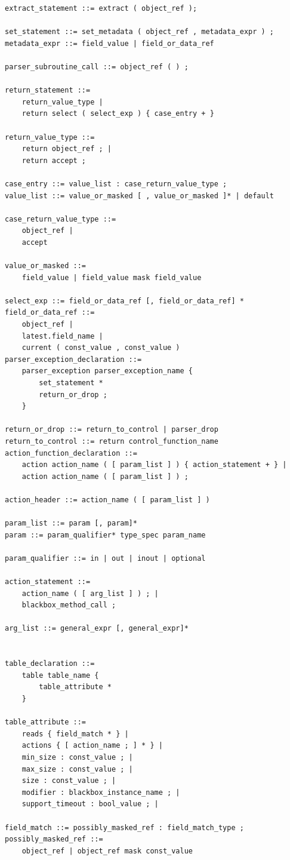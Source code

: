 \documentclass[12pt]{article}
\begin{document}
\begin{lstlisting}[style=BNFstyle]
extract_statement ::= extract ( object_ref ); 

set_statement ::= set_metadata ( object_ref , metadata_expr ) ;
metadata_expr ::= field_value | field_or_data_ref

parser_subroutine_call ::= object_ref ( ) ; 

return_statement ::=
    return_value_type |
    return select ( select_exp ) { case_entry + }

return_value_type ::= 
    return object_ref ; | 
    return accept ;

case_entry ::= value_list : case_return_value_type ;
value_list ::= value_or_masked [ , value_or_masked ]* | default

case_return_value_type ::= 
    object_ref | 
    accept

value_or_masked ::=
    field_value | field_value mask field_value

select_exp ::= field_or_data_ref [, field_or_data_ref] * 
field_or_data_ref ::=
    object_ref |
    latest.field_name |
    current ( const_value , const_value )
parser_exception_declaration ::=
    parser_exception parser_exception_name {
        set_statement *
        return_or_drop ;
    }

return_or_drop ::= return_to_control | parser_drop
return_to_control ::= return control_function_name
action_function_declaration ::=
    action action_name ( [ param_list ] ) { action_statement + } |
    action action_name ( [ param_list ] ) ;

action_header ::= action_name ( [ param_list ] )

param_list ::= param [, param]*
param ::= param_qualifier* type_spec param_name

param_qualifier ::= in | out | inout | optional

action_statement ::= 
    action_name ( [ arg_list ] ) ; |
    blackbox_method_call ;

arg_list ::= general_expr [, general_expr]*


table_declaration ::=
    table table_name {
        table_attribute *
    }

table_attribute ::=
    reads { field_match * } |
    actions { [ action_name ; ] * } |
    min_size : const_value ; |
    max_size : const_value ; |
    size : const_value ; |
    modifier : blackbox_instance_name ; |
    support_timeout : bool_value ; |

field_match ::= possibly_masked_ref : field_match_type ;
possibly_masked_ref ::= 
    object_ref | object_ref mask const_value


\end{lstlisting}
\end{document}
